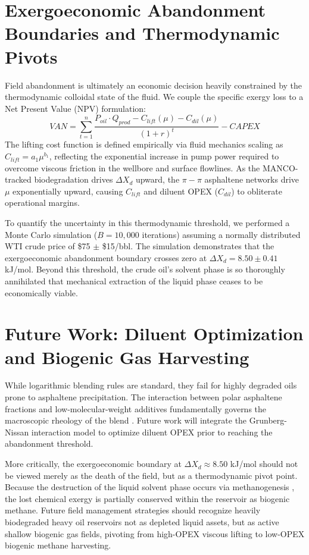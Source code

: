 \documentclass[review,12pt]{elsarticle}
\begin{document}
\section{Exergoeconomic Abandonment Boundaries and Thermodynamic Pivots}
Field abandonment is ultimately an economic decision heavily constrained by the thermodynamic colloidal state of the fluid. We couple the specific exergy loss to a Net Present Value (NPV) formulation:
\begin{equation}
VAN = \sum_{t=1}^{n} \frac{P_{oil} \cdot Q_{prod} - C_{lift}(\mu) - C_{dil}(\mu)}{(1+r)^t} - CAPEX
\end{equation}
The lifting cost function is defined empirically via fluid mechanics scaling as $C_{lift} = a_1 \mu^{b_1}$, reflecting the exponential increase in pump power required to overcome viscous friction in the wellbore and surface flowlines. As the MANCO-tracked biodegradation drives $\Delta X_d$ upward, the $\pi-\pi$ asphaltene networks drive $\mu$ exponentially upward, causing $C_{lift}$ and diluent OPEX ($C_{dil}$) to obliterate operational margins. 

To quantify the uncertainty in this thermodynamic threshold, we performed a Monte Carlo simulation ($B=10,000$ iterations) assuming a normally distributed WTI crude price of \$75 $\pm$ \$15/bbl. The simulation demonstrates that the exergoeconomic abandonment boundary crosses zero at $\Delta X_d = 8.50 \pm 0.41$ kJ/mol. Beyond this threshold, the crude oil's solvent phase is so thoroughly annihilated that mechanical extraction of the liquid phase ceases to be economically viable.

\section{Future Work: Diluent Optimization and Biogenic Gas Harvesting}
While logarithmic blending rules are standard, they fail for highly degraded oils prone to asphaltene precipitation. The interaction between polar asphaltene fractions and low-molecular-weight additives fundamentally governs the macroscopic rheology of the blend \cite{oldenburg2010}. Future work will integrate the Grunberg-Nissan interaction model to optimize diluent OPEX prior to reaching the abandonment threshold.

More critically, the exergoeconomic boundary at $\Delta X_d \approx 8.50$ kJ/mol should not be viewed merely as the death of the field, but as a thermodynamic pivot point. Because the destruction of the liquid solvent phase occurs via methanogenesis \cite{jones2008}, the lost chemical exergy is partially conserved within the reservoir as biogenic methane. Future field management strategies should recognize heavily biodegraded heavy oil reservoirs not as depleted liquid assets, but as active shallow biogenic gas fields, pivoting from high-OPEX viscous lifting to low-OPEX biogenic methane harvesting.
\end{document}
